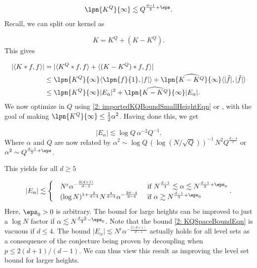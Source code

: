 \documentclass[11pt]{amsart}
\begin{document}
\begin{equation}\label{2: importedKQBoundSmallHeightEqn}
    \lpn{K^Q}{\infty}\lesssim Q^{\frac{d-1}{2}+\eps}.
\end{equation}
Recall, we can split our kernel as

\begin{equation*}
    K = K^{Q}+(K-K^{Q}).
\end{equation*}
This gives

\begin{align*}
   | \langle K*f,f \rangle| & = |\langle K^Q*f,f \rangle  + \langle (K-K^Q)*f,f \rangle|\\
     & \leq \lpn{K^Q}{\infty}\langle \lpn{f}{1}, |f| \rangle  + \lpn{\widehat{K-K^Q}}{\infty}\langle |\hat{f}|,|\hat{f}| \rangle\\
     &\leq\lpn{K^Q}{\infty}|E_\alpha|^2  + \lpn{\widehat{K-K^Q}}{\infty}|E_\alpha|.
\end{align*}
We now optimize in $Q$ using \eqref{2: importedKQBoundSmallHeightEqn} or , with the goal of making $\lpn{K^Q}{\infty}\leq \frac{1}{2}\alpha^2$. Having done this, we get

\begin{equation*}
    |E_\alpha|\lesssim \log Q\,\alpha^{-2}Q^{-1}.
\end{equation*}
Where $\alpha$ and $Q$ are now related by $\alpha^2\sim \log Q\,(\log (N/\sqrt{Q}))^{-1}\,N^2Q^{\frac{d-4}{2}}$ or $\alpha^2\sim Q^{\frac{d-1}{2}+\eps}$.

This yields for all $d\geq 5$

\begin{equation}\label{2: sharpLevelSetEstimatesEqun}
    |E_\alpha|\lesssim \begin{cases}
        \quad N^\epsilon \alpha^{-\frac{2(d+1)}{d-1}} &\text{ if }N^{\frac{d-1}{4}}\lesssim \alpha \lesssim N^{\frac{d-1}{3}+\eps_0}\\
        \quad (\log N)^{1+\frac{2}{d-4}} N^{\frac{4}{d-4}}\alpha^{-\frac{2d-4}{d-4}} &\text{ if }\alpha\gtrsim N^{\frac{d-1}{3}+\eps_0}
    \end{cases}.
\end{equation}
Here, $\eps_0>0$ is arbitrary. The bound for large heights can be improved to just a $\log N$ factor if $\alpha\lesssim N^{\frac{d-2}{2}-\eps_0}$. Note that the bound \eqref{2: KQSpaceBoundEqn} is vacuous if $d\leq 4$. The bound $|E_\alpha|\lesssim N^\epsilon \alpha^{-\frac{2(d+1)}{d-1}}$ actually holds for all level sets as a consequence of the conjecture being proven by decoupling when $p\leq 2(d+1)/(d-1)$. We can thus view this result as improving the level set bound for larger heights.
\end{document}
